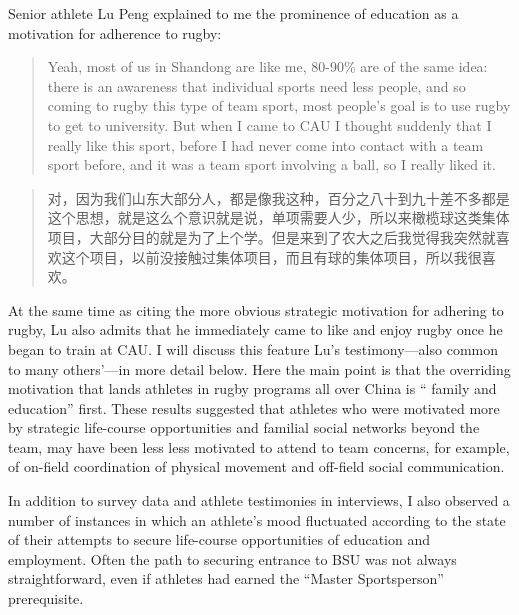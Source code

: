 \begin{CJK}{UTF8}{gbsn}
Senior athlete Lu Peng explained to me the prominence of education as a motivation for adherence to rugby:
          \begin{quote}
              Yeah, most of us in Shandong are like me, 80-90\% are of the same idea: there is an awareness that individual sports need less people, and so coming to rugby this type of team sport, most people's goal is to use rugby to get to university.  But when I came to CAU I thought suddenly that I really like this sport, before I had never come into contact with a team sport before, and it was a team sport involving a ball, so I really liked it.
          \end{quote}
          \begin{quote}
               对，因为我们山东大部分人，都是像我这种，百分之八十到九十差不多都是这个思想，就是这么个意识就是说，单项需要人少，所以来橄榄球这类集体项目，大部分目的就是为了上个学。但是来到了农大之后我觉得我突然就喜欢这个项目，以前没接触过集体项目，而且有球的集体项目，所以我很喜欢。
          \end{quote}
At the same time as citing the more obvious strategic motivation for adhering to rugby, Lu also admits that he immediately came to like and enjoy rugby once he began to train at CAU. I will discuss this feature Lu's testimony—also common to many others'---in more detail below.  Here the main point is that the overriding motivation that lands athletes in rugby programs all over China is `` family and education'' first.
These results suggested that athletes who were motivated more by strategic life-course opportunities and familial social networks beyond the team, may have been less less motivated to attend to team concerns, for example, of on-field coordination of physical movement and off-field social communication.

In addition to survey data and athlete testimonies in interviews, I also observed a number of instances in which an athlete's mood fluctuated according to the state of their attempts to secure life-course opportunities of education and employment.  Often the path to securing entrance to BSU was not always straightforward, even if athletes had earned the ``Master Sportsperson'' prerequisite.


\end{CJK}
